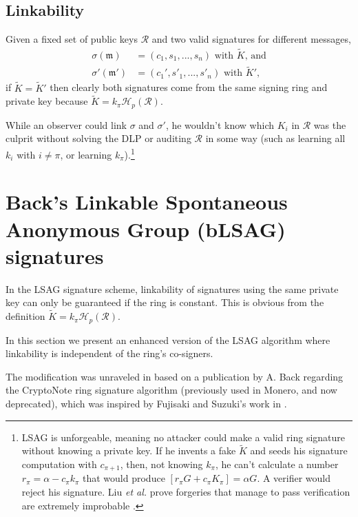 \subsection*{Linkability}

Given a fixed set of public keys \(\mathcal{R}\) and two valid signatures for different messages, 
\begin{align*}
\sigma(\mathfrak{m})   &= (c_1, s_1, ..., s_n)\textrm{ with } \tilde{K}\textrm{, and}\\
\sigma'(\mathfrak{m}')  &= (c_1', s'_1, ..., s'_n)\textrm{ with } \tilde{K}'\textrm{,}
\end{align*}
\quad if \(\tilde{K} =  \tilde{K}'\) then clearly both signatures come from the same signing ring and private key because $\tilde{K}= k_{\pi} \mathcal{H}_p(\mathcal{R})$.

While an observer could link $\sigma$ and $\sigma'$, he wouldn’t know which $K_i$ in $\mathcal{R}$ was the culprit without solving the DLP or auditing $\mathcal{R}$ in some way (such as learning all $k_i$ with $i \neq \pi$, or learning $k_\pi$).\footnote{\label{lsag_unforgeable_note}LSAG is unforgeable, meaning no attacker could make a valid ring signature without knowing a private key. If he invents a fake $\tilde{K}$ and seeds his signature computation with $c_{\pi+1}$, then, not knowing $k_\pi$, he can’t calculate a number $r_\pi = \alpha - c_\pi k_\pi$ that would produce $[r_\pi G + c_\pi K_\pi] = \alpha G$. A verifier would reject his signature. Liu {\em et al.} prove forgeries that manage to pass verification are extremely improbable \cite{Liu2004}.}



\section{Back's Linkable Spontaneous Anonymous Group (bLSAG) signatures}
\label{blsag_note}

In the LSAG signature scheme, linkability of signatures using the same private key can only be guaranteed if the ring is constant. This is obvious from the definition \(\tilde{K} = k_\pi \mathcal{H}_p(\mathcal{R})\).

In this section we present an enhanced version of the LSAG algorithm where linkability is independent of the ring’s co-signers.

The modification was unraveled in \cite{cryptoeprint:2015:1098} based on a publication by A. Back \cite{AdamBack-ring-efficiency} regarding the CryptoNote \cite{cryptoNoteWhitePaper} ring signature algorithm (previously used in Monero, and now deprecated), which was inspired by Fujisaki and Suzuki's work in \cite{Fujisaki2007}.


